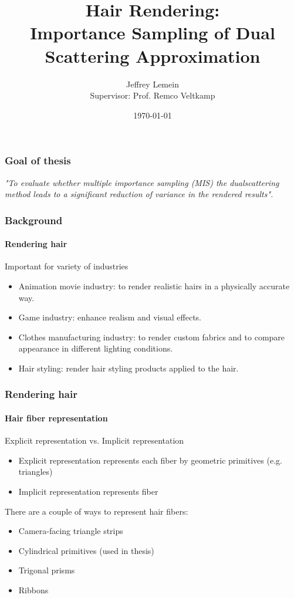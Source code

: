 \documentclass{beamer}
\begin{document}
\title[Hair Rendering]{Hair Rendering:\\ Importance
Sampling of Dual Scattering
Approximation}
\author[J. Lemein]{Jeffrey Lemein\\\small Supervisor: Prof. Remco Veltkamp \\ \hspace{18mm}}
\date{\today}

\begin{frame}
\titlepage
\end{frame}

\begin{frame}
\frametitle{Goal of thesis}
\centering
\textit{"To evaluate whether multiple importance sampling (MIS) the dualscattering method leads to a significant reduction of variance in the rendered results".}

\end{frame}


  \begin{frame}
    \frametitle{Background}
	\framesubtitle{Rendering hair}
	
	Important for variety of industries
	\begin{itemize}
	\item Animation movie industry: to render realistic hairs in a physically accurate way.
	\item Game industry: enhance realism and visual effects.
	\item Clothes manufacturing industry: to render custom fabrics and to compare appearance in different lighting conditions.
	\item Hair styling: render hair styling products applied to the hair.
	\end{itemize}
  \end{frame}
  
  \begin{frame}
    \frametitle{Rendering hair}
	\framesubtitle{Hair fiber representation}
	Explicit representation vs. Implicit representation
	
	\begin{itemize}
	\item Explicit representation represents each fiber by geometric primitives (e.g. triangles)
	\item Implicit representation represents fiber
	\end{itemize}
	
	There are a couple of ways to represent hair fibers:
	\begin{itemize}
	\item Camera-facing triangle strips
	\item Cylindrical primitives (used in thesis)
	\item Trigonal prisms
	\item Ribbons
	\end{itemize}
	

  \end{frame}
  
\end{document}
